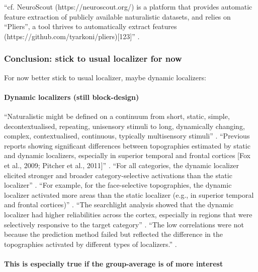 %
``cf. NeuroScout (https://neuroscout.org/) is a platform that provides automatic
feature extraction of publicly available naturalistic datasets, and relies on
``Pliers'', a tool thrives to automatically extract features
(https://github.com/tyarkoni/pliers)[123]'' \citep{aliko2020naturalistic}.



\subsubsection{Conclusion: stick to usual localizer for now}

%
For now better stick to usual localizer, maybe dynamic localizers:


\paragraph{Dynamic localizers (still block-design)}

%
``Naturalistic might be defined on a continuum from short, static, simple,
decontextualised, repeating, unisensory stimuli to long, dynamically changing,
complex, contextualised, continuous, typically multisensory stimuli''
\citep{aliko2020naturalistic}.
%
``Previous reports showing significant differences between topographies
estimated by static and dynamic localizers, especially in superior temporal and
frontal cortices [Fox et al., 2009; Pitcher et al., 2011]''
\citep{jiahui2022cross}.
%
``For all categories, the dynamic localizer elicited stronger and broader
category-selective activations than the static localizer''
\citep{jiahui2022cross}.
%
``For example, for the face-selective topographies, the dynamic localizer
activated more areas than the static localizer (e.g., in superior temporal and
frontal cortices)'' \citep{jiahui2022cross}.
%
``The searchlight analysis showed that the dynamic localizer had higher
reliabilities across the cortex, especially in regions that were selectively
responsive to the target category'' \citep{jiahui2022cross}.
%
``The low correlations were not because the prediction method failed but
reflected the difference in the topographies activated by different types of
localizers.'' \citep{jiahui2022cross}.


\paragraph{This is especially true if the group-average is of more interest}

